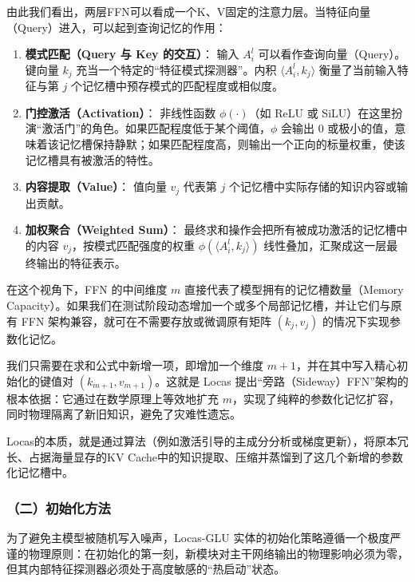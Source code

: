由此我们看出，两层FFN可以看成一个K、V固定的注意力层。当特征向量（Query）进入，可以起到查询记忆的作用：

\begin{enumerate}
\def\labelenumi{\arabic{enumi}.}
\tightlist
\item
  \textbf{模式匹配（Query 与 Key 的交互）}：
  输入 \(A_i^l\) 可以看作查询向量（Query）。键向量 \(k_j\) 充当一个特定的``特征模式探测器''。内积 \(\langle A_i^l,k_j\rangle\) 衡量了当前输入特征与第 \(j\) 个记忆槽中预存模式的匹配程度或相似度。
\item
  \textbf{门控激活（Activation）}：
  非线性函数 \(\phi(\cdot)\)（如 ReLU 或 SiLU）在这里扮演``激活门''的角色。如果匹配程度低于某个阈值，\(\phi\) 会输出 \(0\) 或极小的值，意味着该记忆槽保持静默；如果匹配程度高，则输出一个正向的标量权重，使该记忆槽具有被激活的特性。
\item
  \textbf{内容提取（Value）}：
  值向量 \(v_j\) 代表第 \(j\) 个记忆槽中实际存储的知识内容或输出贡献。
\item
  \textbf{加权聚合（Weighted Sum）}：
  最终求和操作会把所有被成功激活的记忆槽中的内容 \(v_j\)，按模式匹配强度的权重 \(\phi(\langle A_i^l,k_j\rangle)\) 线性叠加，汇聚成这一层最终输出的特征表示。
\end{enumerate}

在这个视角下，FFN 的中间维度 \(m\) 直接代表了模型拥有的记忆槽数量（Memory Capacity）。如果我们在测试阶段动态增加一个或多个局部记忆槽，并让它们与原有 FFN 架构兼容，就可在不需要存放或微调原有矩阵 \((k_j,v_j)\) 的情况下实现参数化记忆。

我们只需要在求和公式中新增一项，即增加一个维度 \(m+1\)，并在其中写入精心初始化的键值对 \((k_{m+1},v_{m+1})\)。这就是 Locas 提出``旁路（Sideway）FFN''架构的根本依据：它通过在数学原理上等效地扩充 \(m\)，实现了纯粹的参数化记忆扩容，同时物理隔离了新旧知识，避免了灾难性遗忘。

Locas的本质，就是通过算法（例如激活引导的主成分分析或梯度更新），将原本冗长、占据海量显存的KV Cache中的知识提取、压缩并蒸馏到了这几个新增的参数化记忆槽中。

\hypertarget{ux4e8cux521dux59cbux5316ux65b9ux6cd5}{%
\subsubsection{（二）初始化方法}\label{ux4e8cux521dux59cbux5316ux65b9ux6cd5}}

为了避免主模型被随机写入噪声，Locas-GLU 实体的初始化策略遵循一个极度严谨的物理原则：在初始化的第一刻，新模块对主干网络输出的物理影响必须为零，但其内部特征探测器必须处于高度敏感的``热启动''状态。


